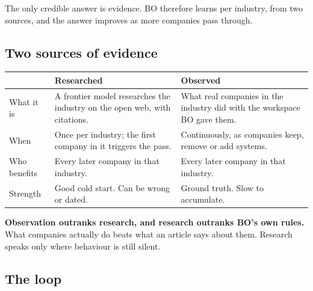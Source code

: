 \documentclass[11pt,a4paper]{article}
\newcommand{\term}[1]{\textcolor{boaccent}{\textbf{#1}}}
\begin{document}
The only credible answer is evidence. BO therefore learns per industry, from two sources, and the
answer improves as more companies pass through.

\subsection{Two sources of evidence}

\begin{center}
\begin{tabular}{@{}l p{5.0cm} p{5.0cm}@{}}
\toprule
 & \textbf{Researched} & \textbf{Observed} \\
\midrule
What it is   & A frontier model researches the industry on the open web, with citations. & What real companies in the industry did with the workspace BO gave them. \\
When         & Once per industry; the first company in it triggers the pass. & Continuously, as companies keep, remove or add systems. \\
Who benefits & Every later company in that industry. & Every later company in that industry. \\
Strength     & Good cold start. Can be wrong or dated. & Ground truth. Slow to accumulate. \\
\bottomrule
\end{tabular}
\end{center}

\term{Observation outranks research, and research outranks BO's own rules.} What companies actually
do beats what an article says about them. Research speaks only where behaviour is still silent.

\subsection{The loop}
\end{document}
